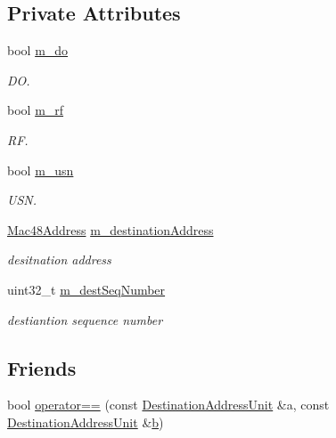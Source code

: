 \subsection*{Private Attributes}
\begin{DoxyCompactItemize}
\item 
bool \hyperlink{classns3_1_1dot11s_1_1DestinationAddressUnit_a77cff681b3a48daeb4c64522f89782a1}{m\+\_\+do}
\begin{DoxyCompactList}\small\item\em DO. \end{DoxyCompactList}\item 
bool \hyperlink{classns3_1_1dot11s_1_1DestinationAddressUnit_aaa7b8cfd99e88d323396ff9e2fc1e913}{m\+\_\+rf}
\begin{DoxyCompactList}\small\item\em RF. \end{DoxyCompactList}\item 
bool \hyperlink{classns3_1_1dot11s_1_1DestinationAddressUnit_aeaf0a74ac7cdf4d70e41d6b494d27bec}{m\+\_\+usn}
\begin{DoxyCompactList}\small\item\em U\+SN. \end{DoxyCompactList}\item 
\hyperlink{classns3_1_1Mac48Address}{Mac48\+Address} \hyperlink{classns3_1_1dot11s_1_1DestinationAddressUnit_abd9d6a66204b05130ee0df2e707305e7}{m\+\_\+destination\+Address}
\begin{DoxyCompactList}\small\item\em desitnation address \end{DoxyCompactList}\item 
uint32\+\_\+t \hyperlink{classns3_1_1dot11s_1_1DestinationAddressUnit_abde24de824eb5a3e4bae44785b196f5e}{m\+\_\+dest\+Seq\+Number}
\begin{DoxyCompactList}\small\item\em destiantion sequence number \end{DoxyCompactList}\end{DoxyCompactItemize}
\subsection*{Friends}
\begin{DoxyCompactItemize}
\item 
bool \hyperlink{classns3_1_1dot11s_1_1DestinationAddressUnit_a9016c416cff1d706aad5c8b1bc56e8c0}{operator==} (const \hyperlink{classns3_1_1dot11s_1_1DestinationAddressUnit}{Destination\+Address\+Unit} \&a, const \hyperlink{classns3_1_1dot11s_1_1DestinationAddressUnit}{Destination\+Address\+Unit} \&\hyperlink{lte__pathloss_8m_a21ad0bd836b90d08f4cf640b4c298e7c}{b})
\end{DoxyCompactItemize}
